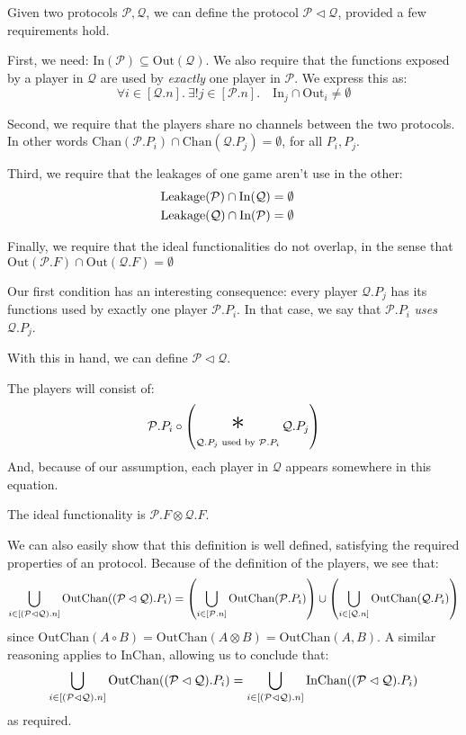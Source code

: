 \begin{definition}
Given two protocols $\mathcal{P}, \mathcal{Q}$,
we can define the protocol $\mathcal{P} \lhd \mathcal{Q}$,
provided a few requirements hold.

First, we need: $\text{In}(\mathcal{P}) \subseteq \text{Out}(\mathcal{Q})$.
We also require that the functions exposed by a player in $\mathcal{Q}$
are used by \emph{exactly} one player in $\mathcal{P}$.
We express this as:
\[
  \forall i \in [\mathcal{Q}.n].\ \exists! j \in [\mathcal{P}.n].\quad \text{In}_j \cap \text{Out}_i \neq \emptyset
\]

Second, we require that the players share no channels between the two
protocols.
In other words $\text{Chan}(\mathcal{P}.P_i) \cap \text{Chan}(\mathcal{Q}.P_j) = \emptyset$, for all $P_i, P_j$.

Third, we require that the leakages of one game aren't use in the other:
$$
\begin{aligned}
&\text{Leakage}(\mathcal{P}) \cap \text{In}(\mathcal{Q}) = \emptyset\cr
&\text{Leakage}(\mathcal{Q}) \cap \text{In}(\mathcal{P}) = \emptyset
\end{aligned}
$$

Finally, we require that the ideal functionalities do not overlap, 
  in the sense that $\text{Out}(\mathcal{P}.F) \cap \text{Out}(\mathcal{Q}.F) = \emptyset$

Our first condition has an interesting consequence: every player $\mathcal{Q}.P_j$
has its functions used by exactly one player $\mathcal{P}.P_i$.
In that case, we say that $\mathcal{P}.P_i$ \emph{uses} $\mathcal{Q}.P_j$.

With this in hand, we can define $\mathcal{P} \lhd \mathcal{Q}$.

The players will consist of:
$$
  \mathcal{P}.P_i \circ \left( \bigast_{\mathcal{Q}.P_j \text{ used by } \mathcal{P}.P_i } \mathcal{Q}.P_j \right)
$$
And, because of our assumption, each player in $\mathcal{Q}$ appears
somewhere in this equation.

The ideal functionality is $\mathcal{P}.F \otimes \mathcal{Q}.F$.

We can also easily show that this definition is well defined, satisfying
the required properties of an protocol.
Because of the definition of the players, we see that:
$$
  \bigcup_{i \in [(\mathcal{P} \lhd \mathcal{Q}).n]} \text{OutChan}((\mathcal{P} \lhd \mathcal{Q}).{P_i})
  = \left(\bigcup_{i \in [\mathcal{P}.n]} \text{OutChan}(\mathcal{P}.P_i)\right) \cup
  \left(\bigcup_{i \in [\mathcal{Q}.n]} \text{OutChan}(\mathcal{Q}.P_i)\right)
$$
  since $\text{OutChan}(A \circ B) = \text{OutChan}(A \otimes B) = \text{OutChan}(A, B)$.
A similar reasoning applies to $\text{InChan}$, allowing us to conclude that:
$$
  \bigcup_{i \in [(\mathcal{P} \lhd \mathcal{Q}).n]} \text{OutChan}((\mathcal{P} \lhd \mathcal{Q}).{P_i}) =
  \bigcup_{i \in [(\mathcal{P} \lhd \mathcal{Q}).n]} \text{InChan}((\mathcal{P} \lhd \mathcal{Q}).{P_i})
$$
as required.


\end{definition}
